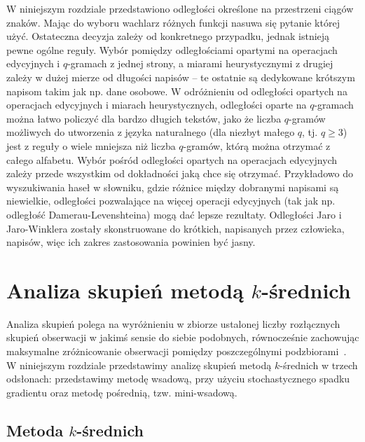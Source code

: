 \documentclass{praca1}
\begin{document}

W niniejszym rozdziale przedstawiono odległości określone na przestrzeni ciągów znaków. Mając do wyboru wachlarz różnych funkcji nasuwa się pytanie której użyć. Ostateczna decyzja zależy od konkretnego przypadku, jednak istnieją pewne ogólne reguły. Wybór pomiędzy odległościami opartymi na operacjach edycyjnych i $q$-gramach z jednej strony, a miarami heurystycznymi z drugiej zależy w dużej mierze od długości napisów -- te ostatnie są dedykowane krótszym napisom takim jak np. dane osobowe. W odróżnieniu od odległości opartych na operacjach edycyjnych i miarach heurystycznych, odległości oparte na $q$-gramach można łatwo policzyć dla bardzo długich tekstów, jako że liczba $q$-gramów możliwych do utworzenia z języka naturalnego (dla niezbyt małego $q$, tj. $q \geq 3$) jest z reguły o wiele mniejsza niż liczba $q$-gramów, którą można otrzymać z całego alfabetu. Wybór pośród odległości opartych na operacjach edycyjnych zależy przede wszystkim od dokładności jaką chce się otrzymać. Przykładowo do wyszukiwania haseł w słowniku, gdzie różnice między dobranymi napisami są niewielkie, odległości pozwalające na więcej operacji edycyjnych (tak jak np. odległość Damerau-Levenshteina) mogą dać lepsze rezultaty. Odległości Jaro i Jaro-Winklera zostały skonstruowane do krótkich, napisanych przez człowieka, napisów, więc ich zakres zastosowania powinien być jasny.


\chapter{Analiza skupień metodą $k$-średnich}
\label{analiza-skupien}

Analiza skupień polega na wyróżnieniu w zbiorze ustalonej liczby rozłącznych skupień obserwacji w jakimś sensie do siebie podobnych, równocześnie zachowując maksymalne zróżnicowanie obserwacji pomiędzy poszczególnymi podzbiorami~\cite{Koronacki2005:statystyczne}. W niniejszym rozdziale przedstawimy analizę skupień metodą $k$-średnich w trzech odsłonach: przedstawimy metodę wsadową, przy użyciu stochastycznego spadku gradientu oraz metodę pośrednią, tzw. mini-wsadową.

\section{Metoda $k$-średnich}
\end{document}
